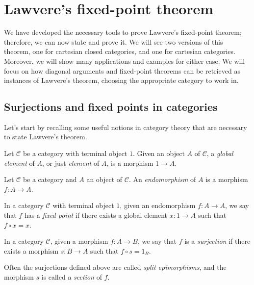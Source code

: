\chapter{Lawvere's fixed-point theorem}
We have developed the necessary tools to prove Lawvere's fixed-point theorem; therefore, we can now state and prove it.
We will see two versions of this theorem, one for cartesian closed categories, and one for cartesian categories.
Moreover, we will show many applications and examples for either case. We will focus on how diagonal arguments and fixed-point theorems
can be retrieved as instances of Lawvere's theorem, choosing the appropriate category to work in.

\section{Surjections and fixed points in categories}
Let's start by recalling some useful notions in category theory that are necessary to state Lawvere's theorem.

\begin{definition}
    Let $\mathcal C$ be a category with terminal object $1$. Given an object $A$ of $\mathcal C$, a \emph{global element} of $A$,
    or just \emph{element} of $A$, is a morphism $1 \to A$.
\end{definition}

\begin{definition}[Endomorphism]
    Let $\mathcal C$ be a category and $A$ an object of $\mathcal C$. An \emph{endomorphism} of $A$ is a morphism $f: A \to A$.
\end{definition}

\begin{definition}
    In a category $\mathcal C$ with terminal object $1$, given an endomorphism $f: A \to A$, we say that $f$ has a \emph{fixed point} if there
    exists a global element $x: 1 \to A$ such that $f \circ x = x$.
\end{definition}

\begin{definition}[Surjection]
    In a category $\mathcal C$, given a morphism $f: A \to B$, we say that $f$ is a \emph{surjection} if there exists a morphism $s : B \to A$ such that $f \circ s = 1_B$.
\end{definition}

\begin{remark}
    Often the surjections defined above are called \emph{split epimorphisms}, and the morphism $s$ is called a \emph{section} of $f$.
\end{remark}

